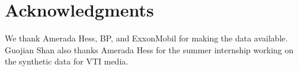 
\section{Acknowledgments}
We thank Amerada Hess, BP, and ExxonMobil for making the data available. Guojian Shan also
thanks Amerada Hess for the summer internship working on the synthetic data for VTI media.




\vskip 1cm


